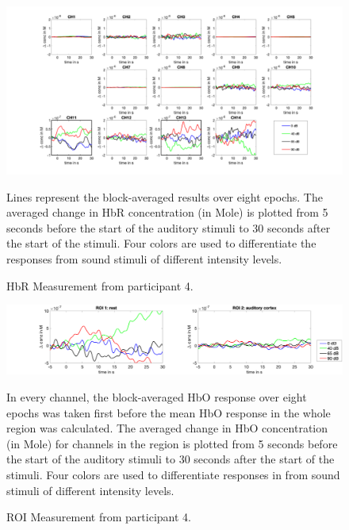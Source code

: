 \newpage


\begin{figure}[H]
  \centering
    \includegraphics[scale=.35]{bilder/HbR_Mole/sub_lin_s_HbR.png}
  \caption{HbR Measurement from participant 4.}
  \medskip
  \footnotesize {Lines represent the block-averaged results over eight epochs. The averaged change in HbR concentration (in Mole) is plotted from 5 seconds before the start of the auditory stimuli to 30 seconds after the start of the stimuli. Four colors are used to differentiate the responses from sound stimuli of different intensity levels.}
\end{figure}

\begin{figure}[H]
  \centering
    \includegraphics[scale=.29]{bilder/ROI/sub_lin_s_HbO.png}
  \caption{ROI Measurement from participant  4.}
  \label{fig:roi4}
  \medskip
  \footnotesize {In every channel, the block-averaged HbO response over eight epochs was taken first before the mean HbO response in the whole region was calculated. The averaged change in HbO concentration (in Mole) for channels in the region is plotted from 5 seconds before the start of the auditory stimuli to 30 seconds after the start of the stimuli. Four colors are used to differentiate responses in from sound stimuli of different intensity levels.}
\end{figure}

\newpage



